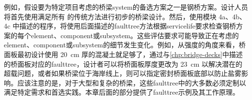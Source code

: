 例如，假设要为特定项目考虑的桥梁\gls*{system}的备选方案之一是钢桥方案。设计人员将首先使用满足所有 \lrfd 的传统方法进行初步的桥梁设计。然后，使用模块 4a、4b、4c 中描述的程序，将使用后面描述的\gls*{faulttree}方法根据\gls*{servicelife}要求检查钢桥方案的每个\gls*{element}、\gls*{component}或\gls*{subsystem}。这些评估要求可能导致正在考虑的\gls*{element}、\gls*{component}或\gls*{subsystem}的细节发生变化。例如，从强度的角度来看，桥面板最初设计使用 \qty{20}{cm} 厚的混凝土就足够了，通过与\cref{chp:bridge-decks}中描述的桥面板对应的\gls*{faulttree}，设计者可以将桥面板厚度更改为 \qty{23}{cm} 以解决潜在的超载问题，或者如果桥梁位于海岸线上，则可以指定密封桥面板底部以防止盐雾影响。应该注意的是，对于大型和复杂的桥梁，这些\gls*{faulttree}中的大多数必须定制以满足特定需求和首选实践。本章后面的部分提供了\gls*{faulttree}示例及其工作原理。

